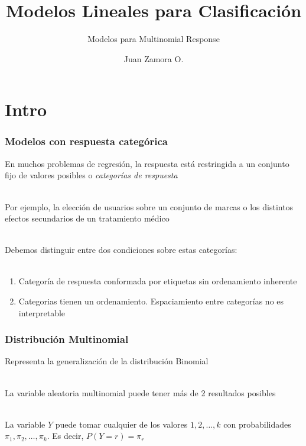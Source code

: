 \documentclass[]{beamer}
\title{Modelos Lineales para Clasificación}
\subtitle{Modelos para Multinomial Response}
\author{Juan Zamora O.}
\date{}
\begin{document}
\begin{frame}
    \titlepage
\end{frame}

\section{Intro}
\begin{frame}
	\frametitle{Modelos con respuesta categórica}
	En muchos problemas de regresión, la respuesta está restringida a un
	conjunto fijo de valores posibles o \textit{categorías de respuesta}\\~\  

	Por ejemplo, la elección de usuarios sobre un conjunto de marcas 
	o los distintos efectos secundarios de un tratamiento médico\\~\  

	Debemos distinguir entre dos condiciones sobre estas categorías:\\~\  

	\begin{enumerate}
		\item Categoría de respuesta conformada por etiquetas sin ordenamiento inherente 
		\item Categorias tienen un ordenamiento. Espaciamiento entre categorías no es interpretable
	\end{enumerate}
	

\end{frame}


\begin{frame}
	\frametitle{Distribución Multinomial}

	Representa la generalización de la  distribución Binomial\\~\  

	La variable aleatoria multinomial puede tener más de 2 resultados posibles\\~\  

	La variable $Y$ puede tomar cualquier de los valores $1,2,\ldots , k$ con probabilidades 
	$\pi_1,\pi_2,\ldots ,\pi_k$. Es decir, $P(Y=r)=\pi_r$ 

	

\end{frame}
\end{document}
